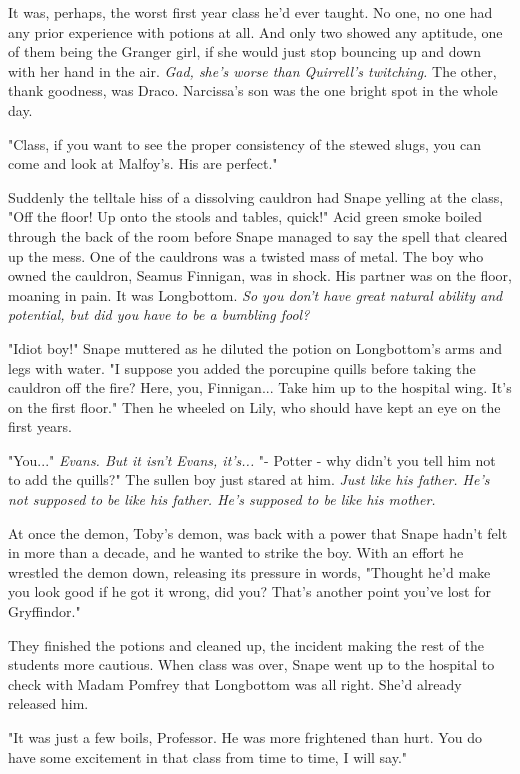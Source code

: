 It was, perhaps, the worst first year class he'd ever taught. No one, no one had any prior experience with potions at all. And only two showed any aptitude, one of them being the Granger girl, if she would just stop bouncing up and down with her hand in the air. \emph{Gad, she's worse than Quirrell's twitching.} The other, thank goodness, was Draco. Narcissa's son was the one bright spot in the whole day.

"Class, if you want to see the proper consistency of the stewed slugs, you can come and look at Malfoy's. His are perfect."

Suddenly the telltale hiss of a dissolving cauldron had Snape yelling at the class, "Off the floor! Up onto the stools and tables, quick!" Acid green smoke boiled through the back of the room before Snape managed to say the spell that cleared up the mess. One of the cauldrons was a twisted mass of metal. The boy who owned the cauldron, Seamus Finnigan, was in shock. His partner was on the floor, moaning in pain. It was Longbottom. \emph{So you don't have great natural ability and potential, but did you have to be a bumbling fool?}

"Idiot boy!" Snape muttered as he diluted the potion on Longbottom's arms and legs with water. "I suppose you added the porcupine quills before taking the cauldron off the fire? Here, you, Finnigan... Take him up to the hospital wing. It's on the first floor." Then he wheeled on Lily, who should have kept an eye on the first years.

"You..." \emph{Evans. But it isn't Evans, it's...} "- Potter - why didn't you tell him not to add the quills?" The sullen boy just stared at him. \emph{Just like his father. He's not supposed to be like his father. He's supposed to be like his mother.}

At once the demon, Toby's demon, was back with a power that Snape hadn't felt in more than a decade, and he wanted to strike the boy. With an effort he wrestled the demon down, releasing its pressure in words, "Thought he'd make you look good if he got it wrong, did you? That's another point you've lost for Gryffindor."

They finished the potions and cleaned up, the incident making the rest of the students more cautious. When class was over, Snape went up to the hospital to check with Madam Pomfrey that Longbottom was all right. She'd already released him.

"It was just a few boils, Professor. He was more frightened than hurt. You do have some excitement in that class from time to time, I will say."

